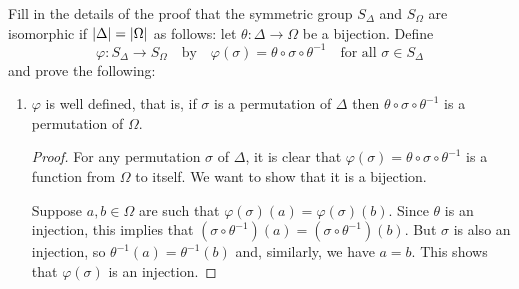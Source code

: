  Fill in the details of the proof that the symmetric
group $S_\Delta$ and $S_\Omega$ are isomorphic if
$\lvert{\Delta}\rvert = \lvert{\Omega}\rvert$ as follows: let
$\theta\colon\Delta\to\Omega$ be a bijection. Define
\begin{equation*}
  \varphi\colon S_\Delta\to S_\Omega
  \quad\text{by}\quad
  \varphi(\sigma) = \theta\circ\sigma\circ\theta^{-1}
  \quad\text{for all $\sigma\in S_\Delta$}
\end{equation*}
and prove the following:
\begin{enumerate}
\item $\varphi$ is well defined, that is, if $\sigma$ is a permutation
  of $\Delta$ then $\theta\circ\sigma\circ\theta^{-1}$ is a
  permutation of $\Omega$.
  \begin{proof}
    For any permutation $\sigma$ of $\Delta$, it is clear that
    $\varphi(\sigma) = \theta\circ\sigma\circ\theta^{-1}$ is a
    function from $\Omega$ to itself. We want to show that it is a
    bijection.

    Suppose $a,b\in\Omega$ are such that
    $\varphi(\sigma)(a) = \varphi(\sigma)(b)$. Since $\theta$ is an
    injection, this implies that
    $(\sigma\circ\theta^{-1})(a) = (\sigma\circ\theta^{-1})(b)$. But
    $\sigma$ is also an injection, so
    $\theta^{-1}(a) = \theta^{-1}(b)$ and, similarly, we have $a =
    b$. This shows that $\varphi(\sigma)$ is an injection.


\end{proof}
\end{enumerate}
